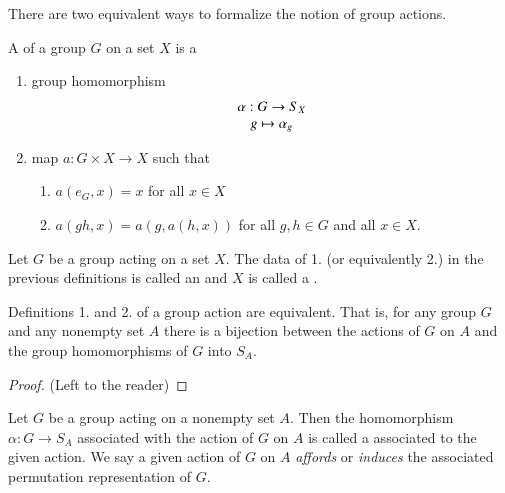 \begin{remark}
        There are two equivalent ways to formalize the notion of group actions.
\end{remark}

\begin{definition}
        A  of a group $G$ on a set $X$ is a \begin{enumerate}
                \item group homomorphism \begin{equation}
                                \begin{array}{c} \alpha:G\rightarrow S_X \\ g\mapsto \alpha_g \end{array}
                \end{equation}
                \item map $a:G\times X \rightarrow X$ such that \begin{enumerate}
                                \item $a(e_G,x) = x$ for all $x \in X$
                                \item $a(gh,x) = a(g,a(h,x))$ for all $g,h \in G$ and all $x \in X$.
                \end{enumerate}
        \end{enumerate}
\end{definition}

\begin{definition}
        Let $G$ be a group acting on a set $X$. The data of 1. (or equivalently 2.) in the previous definitions is called an  and $X$ is called a .
\end{definition}

\begin{claim}
        Definitions 1. and 2. of a group action are equivalent. That is, for any group $G$ and any nonempty set $A$ there is a bijection between the actions of $G$ on $A$ and the group homomorphisms of $G$ into $S_A$.
\end{claim}
\begin{proof}
        (Left to the reader)
\end{proof}


\begin{definition}
    Let $G$ be a group acting on a nonempty set $A$. Then the homomorphism $\alpha:G\rightarrow S_A$ associated with the action of $G$ on $A$ is called a  associated to the given action. We say a given action of $G$ on $A$ \emph{affords} or \emph{induces} the associated permutation representation of $G$.
\end{definition}


